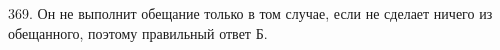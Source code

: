 369. Он не выполнит обещание только в том случае, если не сделает ничего из обещанного, поэтому правильный ответ Б.\\
